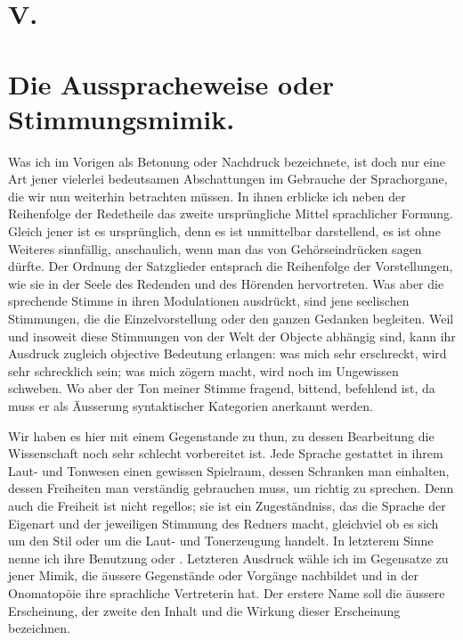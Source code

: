 \section*{V.}\label{IV.III.V}
\section*{Die Ausspracheweise oder Stimmungsmimik.}

\largerpage[1]Was ich im Vorigen als Betonung oder Nachdruck bezeichnete, ist doch nur eine Art jener vielerlei bedeutsamen Abschattungen im Gebrauche der Sprachorgane, die wir nun weiterhin betrachten müssen. In ihnen erblicke ich neben der Reihenfolge der Redetheile das zweite ursprüngliche Mittel sprachlicher Formung. Gleich jener ist es ursprünglich, denn es ist unmittelbar darstellend, es ist ohne Weiteres sinnfällig, \label{fp.361} anschaulich, wenn man das von Gehörseindrücken sagen dürfte. Der Ordnung der Satzglieder entsprach die Reihenfolge der Vorstellungen, wie sie in der Seele des Redenden und des Hörenden hervortreten. Was aber die sprechende Stimme in ihren Modulationen ausdrückt, sind jene seelischen Stimmungen, die die Einzelvorstellung oder den ganzen Gedanken begleiten. Weil und insoweit diese Stimmungen von der Welt der Objecte abhängig sind, kann ihr Ausdruck  zugleich objective Bedeutung erlangen: was mich sehr erschreckt, wird sehr schrecklich sein; was mich zögern macht, wird noch im Ungewissen schweben. Wo aber der Ton meiner Stimme fragend, bittend, befehlend ist, da muss er als  Äusserung syntaktischer Kategorien anerkannt werden.

Wir haben es hier mit einem Gegenstande zu thun, zu dessen Bearbeitung die Wissenschaft noch sehr schlecht vorbereitet ist. Jede Sprache gestattet in ihrem Laut- und Tonwesen einen gewissen Spielraum, dessen Schranken man \label{sp.377} einhalten, dessen Freiheiten man verständig gebrauchen muss, um richtig zu sprechen. Denn auch die Freiheit ist nicht regellos; sie ist ein Zugeständniss, das die Sprache der Eigenart und der jeweiligen Stimmung des Redners macht, gleichviel ob es sich um den Stil oder um die Laut- und Tonerzeugung handelt. In letzterem Sinne nenne ich ihre Benutzung  oder . Letzteren Ausdruck wähle ich im Gegensatze zu jener Mimik, die äussere Gegenstände oder Vorgänge nachbildet und in der Onomatopöie ihre sprachliche Vertreterin hat. Der erstere Name soll die äussere Erscheinung, der zweite den Inhalt und die Wirkung dieser Erscheinung bezeichnen.

